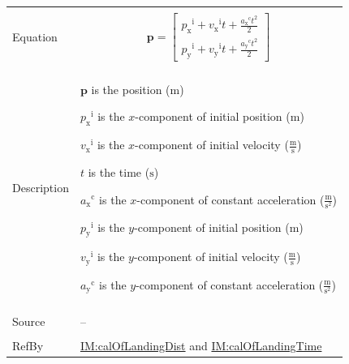 \documentclass[12pt]{article}
\begin{document}
\begin{minipage}{\textwidth}
\begin{tabular}{>{\raggedright}p{}>{\raggedright\arraybackslash}p{}}
\\ \midrule \\
Equation & \begin{displaymath}
           \symbf{p}=\begin{bmatrix}
                     {{p_{\text{x}}}^{\text{i}}}+{{v_{\text{x}}}^{\text{i}}} t+\frac{{{a_{\text{x}}}^{\text{c}}} t^{2}}{2}\\
                     {{p_{\text{y}}}^{\text{i}}}+{{v_{\text{y}}}^{\text{i}}} t+\frac{{{a_{\text{y}}}^{\text{c}}} t^{2}}{2}
                     \end{bmatrix}
           \end{displaymath}
\\ \midrule \\
Description & \begin{symbDescription}
              \item{$\symbf{p}$ is the position (${\text{m}}$)}
              \item{${{p_{\text{x}}}^{\text{i}}}$ is the $x$-component of initial position (${\text{m}}$)}
              \item{${{v_{\text{x}}}^{\text{i}}}$ is the $x$-component of initial velocity ($\frac{\text{m}}{\text{s}}$)}
              \item{$t$ is the time (${\text{s}}$)}
              \item{${{a_{\text{x}}}^{\text{c}}}$ is the $x$-component of constant acceleration ($\frac{\text{m}}{\text{s}^{2}}$)}
              \item{${{p_{\text{y}}}^{\text{i}}}$ is the $y$-component of initial position (${\text{m}}$)}
              \item{${{v_{\text{y}}}^{\text{i}}}$ is the $y$-component of initial velocity ($\frac{\text{m}}{\text{s}}$)}
              \item{${{a_{\text{y}}}^{\text{c}}}$ is the $y$-component of constant acceleration ($\frac{\text{m}}{\text{s}^{2}}$)}
              \end{symbDescription}
\\ \midrule \\
Source & --
         
\\ \midrule \\
RefBy & \hyperref[IM:calOfLandingDist]{IM:calOfLandingDist} and \hyperref[IM:calOfLandingTime]{IM:calOfLandingTime}
        
\\ \bottomrule
\end{tabular}
\end{minipage}
\end{document}
